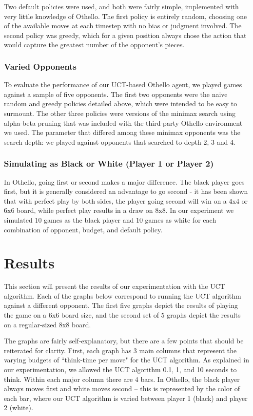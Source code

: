\documentclass[12pt,letterpaper]{article}
\begin{document}
Two default policies were used, and both were fairly simple, implemented with very little knowledge of Othello. The first policy is entirely random, choosing one of the available moves at each timestep with no bias or judgment involved. The second policy was greedy, which for a given position always chose the action that would capture the greatest number of the opponent's pieces.

\subsubsection{Varied Opponents}
To evaluate the performance of our UCT-based Othello agent, we played games against a sample of five opponents. The first two opponents were the naive random and greedy policies detailed above, which were intended to be easy to surmount. The other three policies were versions of the minimax search using alpha-beta pruning that was included with the third-party Othello environment we used. The parameter that differed among these minimax opponents was the search depth: we played against opponents that searched to depth 2, 3 and 4.

\subsubsection{Simulating as Black or White (Player 1 or Player 2)}
In Othello, going first or second makes a major difference. The black player goes first, but it is generally considered an advantage to go second - it has been shown that with perfect play by both sides, the player going second will win on a 4x4 or 6x6 board, while perfect play results in a draw on 8x8. In our experiment we simulated 10 games as the black player and 10 games as white for each combination of opponent, budget, and default policy.

\section{Results}
\label{results}

This section will present the results of our experimentation with the UCT algorithm. Each of the graphs below correspond to running the UCT algorithm against a different opponent.  The first five graphs depict the results of playing the game on a 6x6 board size, and the second set of 5 graphs depict the results on a regular-sized 8x8 board.

The graphs are fairly self-explanatory, but there are a few points that should be reiterated for clarity.  First, each graph has 3 main columns that represent the varying budgets of ``think-time per move" for the UCT algorithm.  As explained in our experimentation, we allowed the UCT algorithm 0.1, 1, and 10 seconds to think. Within each major column there are 4 bars.  In Othello, the black player always moves first and white moves second -- this is represented by the color of each bar, where our UCT algorithm is varied between player 1 (black) and player 2 (white). 
\end{document}
